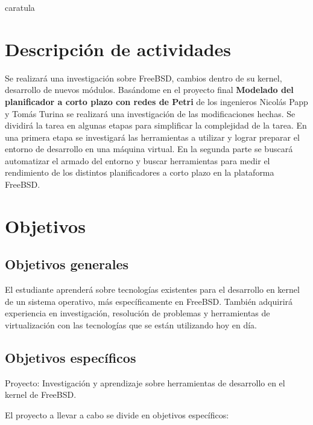 \documentclass[a4paper, 11pt]{article}
\begin{document}
{caratula}

\section*{Descripción de actividades}

\vspace{0.4cm}
\large
Se realizará una investigación sobre FreeBSD, cambios dentro de su kernel, desarrollo de nuevos módulos. Basándome en el proyecto final \textbf{Modelado del planificador a corto plazo con redes de Petri} de los ingenieros Nicolás Papp y Tomás Turina se realizará una investigación de las modificaciones hechas. Se dividirá la tarea en algunas etapas para simplificar la complejidad de la tarea.
En una primera etapa se investigará las herramientas a utilizar y lograr preparar el entorno de desarrollo en una máquina virtual. En la segunda parte se buscará automatizar el armado del entorno y buscar herramientas para medir el rendimiento de los distintos planificadores a corto plazo en la plataforma FreeBSD.

\newpage

\section*{Objetivos}
\subsection*{Objetivos generales}

El estudiante aprenderá sobre tecnologías existentes para el desarrollo en kernel de un sistema operativo, más específicamente en FreeBSD. También adquirirá experiencia en investigación, resolución de problemas y herramientas de virtualización con las tecnologías que se están utilizando hoy en día.

\vspace{0.7cm}
\subsection*{Objetivos específicos}

Proyecto: Investigación y aprendizaje sobre herramientas de desarrollo en el kernel de FreeBSD.

\vspace{0.5cm}
El proyecto a llevar a cabo se divide en objetivos específicos:
\end{document}
